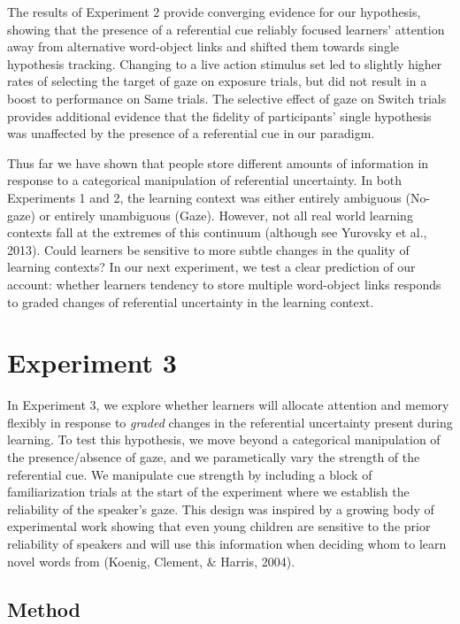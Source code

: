 \documentclass[a4paper,man,floatsintext]{apa6}
\begin{document}
The results of Experiment 2 provide converging evidence for our
hypothesis, showing that the presence of a referential cue reliably
focused learners' attention away from alternative word-object links and
shifted them towards single hypothesis tracking. Changing to a live
action stimulus set led to slightly higher rates of selecting the target
of gaze on exposure trials, but did not result in a boost to performance
on Same trials. The selective effect of gaze on Switch trials provides
additional evidence that the fidelity of participants' single hypothesis
was unaffected by the presence of a referential cue in our paradigm.

Thus far we have shown that people store different amounts of
information in response to a categorical manipulation of referential
uncertainty. In both Experiments 1 and 2, the learning context was
either entirely ambiguous (No-gaze) or entirely unambiguous (Gaze).
However, not all real world learning contexts fall at the extremes of
this continuum (although see Yurovsky et al., 2013). Could learners be
sensitive to more subtle changes in the quality of learning contexts? In
our next experiment, we test a clear prediction of our account: whether
learners tendency to store multiple word-object links responds to graded
changes of referential uncertainty in the learning context.

\section{Experiment 3}\label{experiment-3}

In Experiment 3, we explore whether learners will allocate attention and
memory flexibly in response to \emph{graded} changes in the referential
uncertainty present during learning. To test this hypothesis, we move
beyond a categorical manipulation of the presence/absence of gaze, and
we parametically vary the strength of the referential cue. We manipulate
cue strength by including a block of familiarization trials at the start
of the experiment where we establish the reliability of the speaker's
gaze. This design was inspired by a growing body of experimental work
showing that even young children are sensitive to the prior reliability
of speakers and will use this information when deciding whom to learn
novel words from (Koenig, Clement, \& Harris, 2004).

\subsection{Method}\label{method-2}
\end{document}
